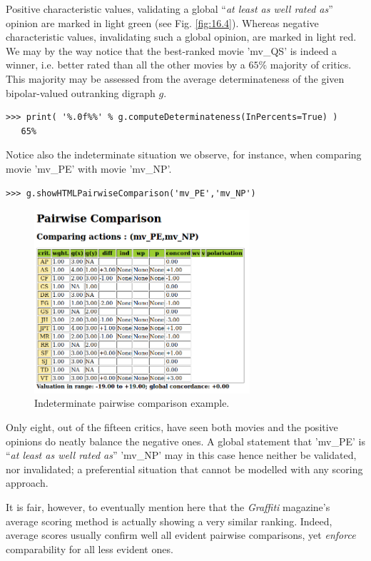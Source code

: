 Positive characteristic values, validating a global ``\emph{at least as well rated as}'' opinion are marked in light green (see Fig. \ref{fig:16.4}). Whereas negative characteristic values, invalidating such a global opinion, are marked in light red. We may by the way notice that the best-ranked movie 'mv\_QS' is indeed a \Condorcet winner, i.e. better rated than all the other movies by a $65\%$ majority of critics. This majority may be assessed from the average determinateness of the given bipolar-valued outranking digraph $g$.

\begin{lstlisting}      
>>> print( '%.0f%%' % g.computeDeterminateness(InPercents=True) )
   65%
\end{lstlisting}

Notice also the indeterminate situation we observe, for instance, when comparing movie 'mv\_PE' with movie 'mv\_NP'.

\begin{lstlisting}      
>>> g.showHTMLPairwiseComparison('mv_PE','mv_NP')
\end{lstlisting}
\begin{figure}[h]
\includegraphics[width=8cm]{Figures/graffiti07_6.png}
\caption{Indeterminate pairwise comparison example.}
\label{fig:16.5}       %
\end{figure}

Only eight, out of the fifteen critics, have seen both movies and the positive opinions do neatly balance the negative ones. A global statement that 'mv\_PE' is ``\emph{at least as well rated as}'' 'mv\_NP'  may in this case hence neither be validated, nor invalidated; a preferential situation that cannot be modelled with any scoring approach.

It is fair, however, to eventually mention here that the \emph{Graffiti} magazine's average scoring method is actually showing a very similar ranking. Indeed, average scores usually confirm well all evident pairwise comparisons, yet \emph{enforce} comparability for all less evident ones.

